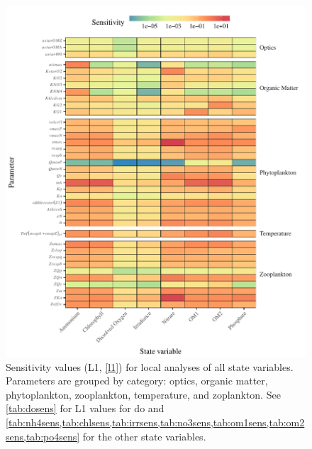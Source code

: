 \documentclass[letterpaper,12pt,oneside]{article}\usepackage[]{graphicx}\usepackage[]{color}
\begin{document}
\begin{figure}[!ht]

{\centering \includegraphics[width=\textwidth]{figs/sensalltile-1} 

}

\caption{Sensitivity values (L1, \cref{l1}) for local analyses of all state variables. Parameters are grouped by category: optics, organic matter, phytoplankton, zooplankton, temperature, and zoplankton.  See \cref{tab:dosens} for L1 values for \ac{do} and \cref{tab:nh4sens,tab:chlsens,tab:irrsens,tab:no3sens,tab:om1sens,tab:om2sens,tab:po4sens} for the other state variables.}\label{fig:sensalltile}
\end{figure}
\end{document}
